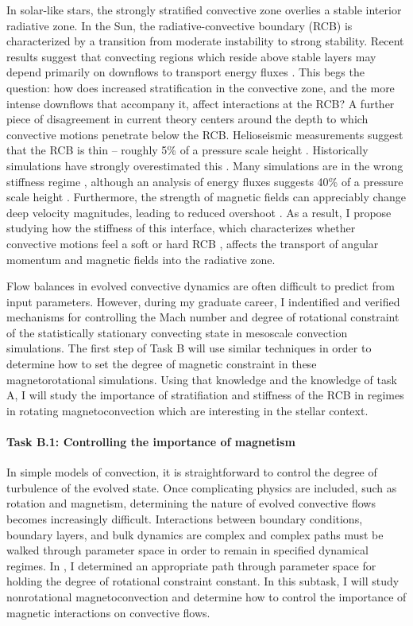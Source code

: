 \documentclass[aasms,11pt, longbibliography]{article}
\begin{document}
In solar-like stars, the strongly stratified convective zone overlies a stable interior radiative zone.
In the Sun, the radiative-convective boundary (RCB) is characterized by a transition from moderate instability to strong stability.
Recent results suggest that convecting regions which reside above stable layers may depend primarily on downflows to transport energy fluxes \citep{kapyla&all2017}.
This begs the question: how does increased stratification in the convective zone, and the more intense downflows that accompany it, affect interactions at the RCB?
A further piece of disagreement \citep{hotta2017} in current theory centers around the depth to which convective motions penetrate below the RCB.
Helioseismic measurements suggest that the RCB is thin -- roughly 5\% of a pressure scale height \citep{basu1997}.
Historically simulations have strongly overestimated this \citep[][and others]{kapyla2018}.
Many simulations are in the wrong stiffness regime \citep{brummell&all2002}, although an analysis of energy fluxes suggests 40\% of a pressure scale height \citep{rempel2004}.
Furthermore, the strength of magnetic fields can appreciably change deep velocity magnitudes, leading to reduced overshoot \citep{hotta&all2015}.
As a result, I propose studying how the stiffness of this interface, which characterizes whether convective motions feel a soft or hard RCB \citep{couston&all2017}, affects the transport of angular momentum and magnetic fields into the radiative zone.

Flow balances in evolved convective dynamics are often difficult to predict from input parameters.
However, during my graduate career, I indentified and verified mechanisms for controlling the Mach number \citep{anders&brown2017} and degree of rotational constraint \citep[][and Fig. \ref{fig:rossby_plot}]{anders&all2019} of the statistically stationary convecting state in mesoscale convection simulations.
The first step of Task B will use similar techniques in order to determine how to set the degree of magnetic constraint in these magnetorotational simulations.
Using that knowledge and the knowledge of task A, I will study the importance of stratifiation and stiffness of the RCB in regimes in rotating magnetoconvection which are interesting in the stellar context.

\paragraph{Task B.1: Controlling the importance of magnetism}
\label{sct:taskB1}
In simple models of convection, it is straightforward to control the degree of turbulence of the evolved state.
Once complicating physics are included, such as rotation and magnetism, determining the nature of evolved convective flows becomes increasingly difficult.
Interactions between boundary conditions, boundary layers, and bulk dynamics are complex and complex paths must be walked through parameter space in order to remain in specified dynamical regimes.
In \citet{anders&all2019}, I determined an appropriate path through parameter space for holding the degree of rotational constraint constant.
In this subtask, I will study nonrotational magnetoconvection and determine how to control the importance of magnetic interactions on convective flows.
\end{document}
